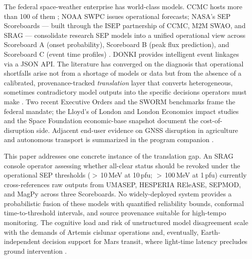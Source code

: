 \documentclass[11pt,letterpaper]{article}
\begin{document}
The federal space-weather enterprise has world-class models.
CCMC hosts more than 100 of them \cite{ccmc}; NOAA SWPC issues operational
forecasts; NASA's SEP Scoreboards --- built through the ISEP partnership of
CCMC, M2M SWAO, and SRAG --- consolidate research SEP models into a unified
operational view across Scoreboard A (onset probability), Scoreboard B (peak
flux prediction), and Scoreboard C (event time profiles)
\cite{sepscoreboard,whitman2023,whitman2024}.  DONKI \cite{donki} provides
intelligent event linkages via a JSON API.  The literature has converged on
the diagnosis that operational shortfalls arise not from a shortage of
models or data but from the absence of a calibrated, provenance-tracked
\emph{translation} layer that converts heterogeneous, sometimes contradictory
model outputs into the specific decisions operators must make
\cite{swag2023,hapgood2023,r2o2r2022,decadal2025,proswift2020,nstc2019,benchmarks2018}.
Two recent Executive Orders \cite{eo13744,eo13865} and the SWORM
benchmarks \cite{benchmarks2018} frame the federal mandate; the
Lloyd's of London and London Economics impact studies
\cite{lloyds2013,londecon2017} and the Space Foundation
economic-base snapshot \cite{spacereport2025} document the cost-of-disruption
side.  Adjacent end-user evidence on GNSS disruption in agriculture
\cite{ntrs_brazil2025,seesaw2022,osuext2024,afbf2024,starion2024} and
autonomous transport \cite{sae2020} is summarized in the program companion
\cite{helios_internal}.

This paper addresses one concrete instance of the translation gap.  An SRAG
console operator assessing whether all-clear status should be revoked
under the operational SEP thresholds ($>$\,10\,MeV at 10\,pfu;
$>$\,100\,MeV at 1\,pfu) currently cross-references raw outputs from
UMASEP, HESPERIA REleASE, SEPMOD, and MagPy across three Scoreboards.  No
widely-deployed system provides a probabilistic fusion of these models with
quantified reliability bounds, conformal time-to-threshold intervals, and
source provenance suitable for high-tempo monitoring.  The cognitive load and
risk of unstructured model disagreement scale with the demands of Artemis
cislunar operations and, eventually, Earth-independent decision support for
Mars transit, where light-time latency precludes ground intervention
\cite{decadal2025}.
\end{document}
